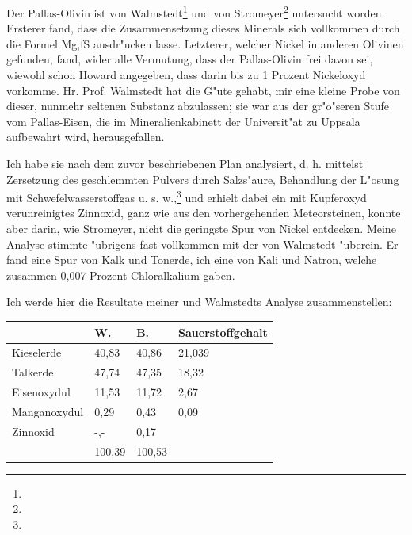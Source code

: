 \documentclass[a4paper, 11pt, oneside]{article}
\begin{document}
Der Pallas-Olivin ist von Walmstedt\footnote{} und von Stromeyer\footnote{} untersucht worden. Ersterer fand, dass die Zusammensetzung dieses Minerals sich vollkommen durch die Formel {Mg,f}S ausdr"ucken lasse. Letzterer, welcher Nickel in anderen Olivinen gefunden, fand, wider alle Vermutung, dass der Pallas-Olivin frei davon sei, wiewohl schon Howard angegeben, dass darin bis zu 1 Prozent Nickeloxyd vorkomme. Hr. Prof. Walmstedt hat die G"ute gehabt, mir eine kleine Probe von dieser, nunmehr seltenen Substanz abzulassen; sie war aus der gr"o"seren Stufe vom Pallas-Eisen, die im Mineralienkabinett der Universit"at zu Uppsala aufbewahrt wird, herausgefallen.

Ich habe sie nach dem zuvor beschriebenen Plan analysiert, d. h. mittelst Zersetzung des geschlemmten Pulvers durch Salzs"aure, Behandlung der L"osung mit Schwefelwasserstoffgas u. s. w.,\footnote{} und erhielt dabei ein mit Kupferoxyd verunreinigtes Zinnoxid, ganz wie aus den vorhergehenden Meteorsteinen, konnte aber darin, wie Stromeyer, nicht die geringste Spur von Nickel entdecken. Meine Analyse stimmte "ubrigens fast vollkommen mit der von Walmstedt "uberein. Er fand eine Spur von Kalk und Tonerde, ich eine von Kali und Natron, welche zusammen 0,007 Prozent Chloralkalium gaben.

Ich werde hier die Resultate meiner und Walmstedts Analyse zusammenstellen:
\begin{center}
\begin{tabular}{ |p{30mm}|p{20mm}|p{20mm}|p{30mm}| }
    \hline
      & W. & B. & Sauerstoffgehalt\\\hline
      Kieselerde & 40,83 & 40,86 & 21,039\\\hline
      Talkerde & 47,74 & 47,35 & 18,32\\\hline
      Eisenoxydul & 11,53 & 11,72 & 2,67\\\hline
      Manganoxydul & 0,29 & 0,43 & 0,09\\\hline
      Zinnoxid & -,- & 0,17  & \\\hline
       & 100,39 & 100,53 & \\
    \hline
\end{tabular}
\end{center}
\end{document}
